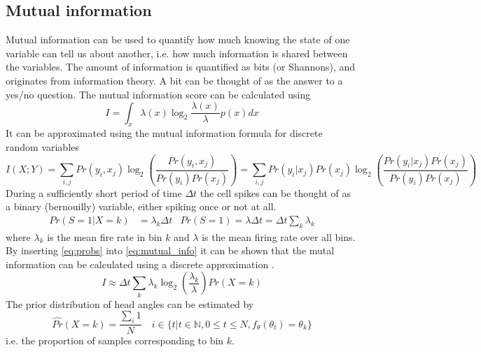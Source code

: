 \subsection{Mutual information}
Mutual information can be used to quantify how much knowing the state of one variable can tell us about another, i.e. how much information is shared between the variables.
The amount of information is quantified as bits (or Shannons), and originates from information theory. A bit can be thought of as the answer to a yes/no question. 
The mutual information score can be calculated using 
\begin{equation} \label{eq:mutinfo_cont}
    I = \int_x \lambda(x) \log_2{\frac{\lambda(x)}{\lambda}}p(x) dx
\end{equation}
It can be approximated using the mutual information formula for discrete random variables
\begin{equation}\label{eq:mutual_info}
    I(X;Y) = \sum_{i, j} Pr(y_i,x_j) \log_2(\frac{Pr(y_i, x_j)}{Pr(y_i)Pr(x_j)}) = \sum_{i,j}Pr(y_i|x_j)Pr(x_j) \log_2(\frac{Pr(y_i | x_j)Pr(x_j)}{Pr(y_i)Pr(x_j)})
\end{equation}
During a sufficiently short period of time $\Delta t$ the cell spikes can be thought of as a binary (bernouilly) variable, either spiking once or not at all. \cite{mutualinfo}
\begin{align} \label{eq:probs}
    Pr(S=1 | X = k) &= \lambda_k \Delta t & Pr(S=1) = \lambda \Delta t = \Delta t \sum_k \lambda_k
\end{align}
where $\lambda_k$ is the mean fire rate in bin $k$ and $\lambda$ is the mean firing rate over all bins.
By inserting \cref{eq:probs} into \cref{eq:mutual_info} it can be shown that the mutal information can be calculated using a discrete approximation \cite{mutualinfo}.
\begin{equation} \label{eq:mutinfo_disc}
    I \approx \Delta t \sum_k \lambda_k \log_2(\frac{\lambda_k}{\lambda})Pr(X = k)
\end{equation}
The prior distribution of head angles can be estimated by
\begin{equation}
    \hat{Pr}(X = k) = \frac{\sum_i 1}{N}  \quad i \in \{t | t \in \mathbb{N}, 0 \leq t \leq N, f_\theta(\theta_t) = \theta_k\}
\end{equation}
i.e. the proportion of samples corresponding to bin $k$.

